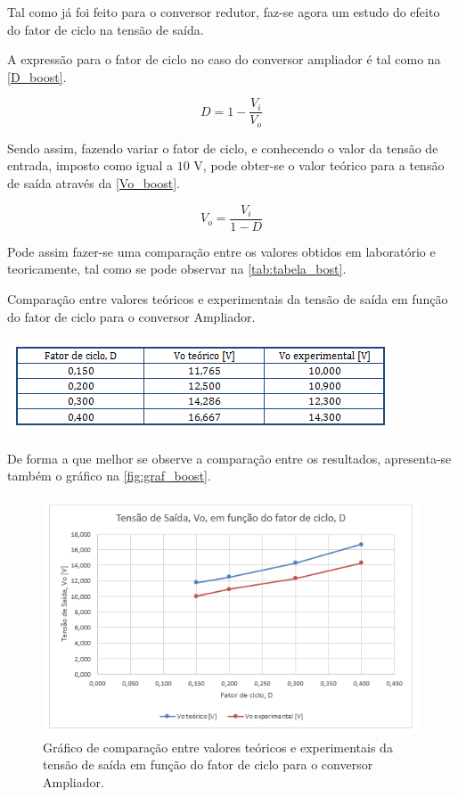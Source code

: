 \documentclass[a4paper,11pt]{article}
\numberwithin{equation}{section}
\begin{document}
Tal como já foi feito para o conversor redutor, faz-se agora um estudo do efeito do fator de ciclo na tensão de saída.

A expressão para o fator de ciclo no caso do conversor ampliador é tal como na \autoref{D_boost}.

\begin{equation}
	D = 1 - \frac{V_i}{V_o} \label{D_boost}
\end{equation}

Sendo assim, fazendo variar o fator de ciclo, e conhecendo o valor da tensão de entrada, imposto como igual a $10$ V, pode obter-se o valor teórico para a tensão de saída através da \autoref{Vo_boost}.

\begin{equation}
	V_o = \frac{V_i}{1-D} \label{Vo_boost}
\end{equation}


Pode assim fazer-se uma comparação entre os valores obtidos em laboratório e teoricamente, tal como se pode observar na \autoref{tab:tabela_bost}.

\begin{table}[!htb]
	\centering
	\caption{Comparação entre valores teóricos e experimentais da tensão de saída em função do fator de ciclo para o conversor Ampliador.}
	\includegraphics[width=0.8\linewidth]{teoricas/tabela_boost}
	\label{tab:tabela_bost}
\end{table}

De forma a que melhor se observe a comparação entre os resultados, apresenta-se também o gráfico na \autoref{fig:graf_boost}.

\begin{figure}[H]
	\centering
	\includegraphics[keepaspectratio=true, scale=1.0]{teoricas/graf_boost}
	\caption{Gráfico de comparação entre valores teóricos e experimentais da tensão de saída em função do fator de ciclo para o conversor Ampliador.}
	\label{fig:graf_boost}
	\vspace{-0.8em}
\end{figure}
\end{document}
